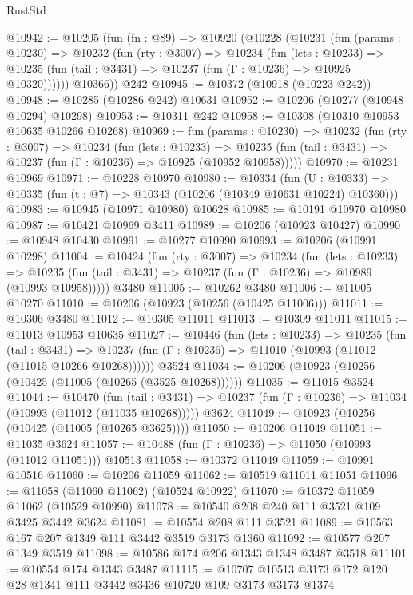 \begin{lexlean}{RustStd}
\begin{coremodule}
@10942 := @10205
    (fun (fn : @89) =>
    @10920
      (@10228
        (@10231
          (fun (params : @10230) =>
          @10232
            (fun (rty : @3007) =>
            @10234
              (fun (lets : @10233) =>
              @10235 (fun (tail : @3431) => @10237 (fun (Γ : @10236) => @10925 @10320))))))
        @10366))
    @242
@10945 := @10372 (@10918 (@10223 @242))
@10948 := @10285 (@10286 @242) @10631
@10952 := @10206 (@10277 (@10948 @10294) @10298)
@10953 := @10311 @242
@10958 := @10308 (@10310 @10953 @10635 @10266 @10268)
@10969 := fun (params : @10230) =>
  @10232
    (fun (rty : @3007) =>
    @10234
      (fun (lets : @10233) =>
      @10235 (fun (tail : @3431) => @10237 (fun (Γ : @10236) => @10925 (@10952 @10958)))))
@10970 := @10231 @10969
@10971 := @10228 @10970
@10980 := @10334
    (fun (U : @10333) => @10335 (fun (t : @7) => @10343 (@10206 (@10349 @10631 @10224) @10360)))
@10983 := @10945 (@10971 @10980) @10628
@10985 := @10191 @10970 @10980
@10987 := @10421 @10969 @3411
@10989 := @10206 (@10923 @10427)
@10990 := @10948 @10430
@10991 := @10277 @10990
@10993 := @10206 (@10991 @10298)
@11004 := @10424
    (fun (rty : @3007) =>
    @10234
      (fun (lets : @10233) =>
      @10235 (fun (tail : @3431) => @10237 (fun (Γ : @10236) => @10989 (@10993 @10958)))))
    @3480
@11005 := @10262 @3480
@11006 := @11005 @10270
@11010 := @10206 (@10923 (@10256 (@10425 @11006)))
@11011 := @10306 @3480
@11012 := @10305 @11011
@11013 := @10309 @11011
@11015 := @11013 @10953 @10635
@11027 := @10446
    (fun (lets : @10233) =>
    @10235
      (fun (tail : @3431) =>
      @10237 (fun (Γ : @10236) => @11010 (@10993 (@11012 (@11015 @10266 @10268))))))
    @3524
@11034 := @10206 (@10923 (@10256 (@10425 (@11005 (@10265 (@3525 @10268))))))
@11035 := @11015 @3524
@11044 := @10470
    (fun (tail : @3431) => @10237 (fun (Γ : @10236) => @11034 (@10993 (@11012 (@11035 @10268)))))
    @3624
@11049 := @10923 (@10256 (@10425 (@11005 (@10265 @3625))))
@11050 := @10206 @11049
@11051 := @11035 @3624
@11057 := @10488 (fun (Γ : @10236) => @11050 (@10993 (@11012 @11051))) @10513
@11058 := @10372 @11049
@11059 := @10991 @10516
@11060 := @10206 @11059
@11062 := @10519 @11011 @11051
@11066 := @11058 (@11060 @11062) (@10524 @10922)
@11070 := @10372 @11059 @11062 (@10529 @10990)
@11078 := @10540 @208 @240 @111 @3521 @109 @3425 @3442 @3624
@11081 := @10554 @208 @111 @3521
@11089 := @10563 @167 @207 @1349 @111 @3442 @3519 @3173 @1360
@11092 := @10577 @207 @1349 @3519
@11098 := @10586 @174 @206 @1343 @1348 @3487 @3518
@11101 := @10554 @174 @1343 @3487
@11115 := @10707 @10513 @3173 @172 @120 @28 @1341 @111 @3442 @3436 @10720 @109 @3173 @3173 @1374

\end{coremodule}
\end{lexlean}
